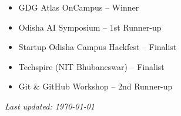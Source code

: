 \documentclass[a4paper,12pt]{article}
\begin{document}
\begin{itemize}
\item GDG Atlas OnCampus -- Winner
\item Odisha AI Symposium -- 1st Runner-up
\item Startup Odisha Campus Hackfest -- Finalist
\item Techspire (NIT Bhubaneswar) -- Finalist
\item Git \& GitHub Workshop -- 2nd Runner-up
\end{itemize}

\vfill
\begin{center}
\footnotesize \textit{Last updated: \today}
\end{center}
\end{document}
